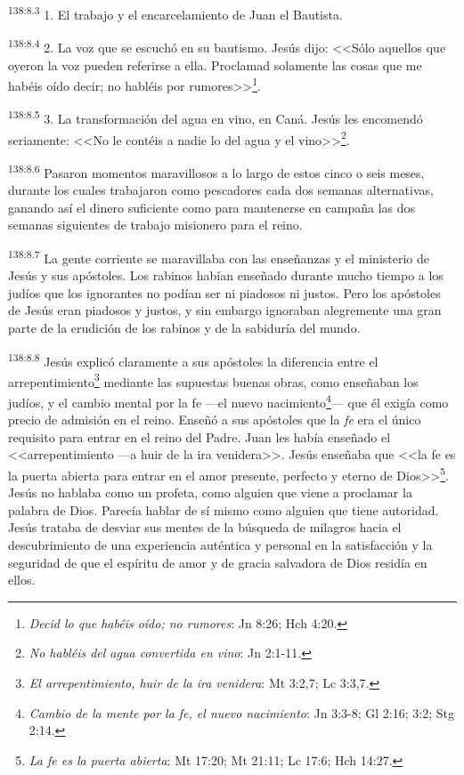 \par 
\textsuperscript{138:8.3} 1. El trabajo y el encarcelamiento de Juan el Bautista.

\par 
\textsuperscript{138:8.4} 2. La voz que se escuchó en su bautismo. Jesús dijo: <<Sólo aquellos que oyeron la voz pueden referirse a ella. Proclamad solamente las cosas que me habéis oído decir; no habléis por rumores>>\footnote{\textit{Decid lo que habéis oído; no rumores}: Jn 8:26; Hch 4:20.}.

\par 
\textsuperscript{138:8.5} 3. La transformación del agua en vino, en Caná. Jesús les encomendó seriamente: <<No le contéis a nadie lo del agua y el vino>>\footnote{\textit{No habléis del agua convertida en vino}: Jn 2:1-11.}.

\par 
\textsuperscript{138:8.6} Pasaron momentos maravillosos a lo largo de estos cinco o seis meses, durante los cuales trabajaron como pescadores cada dos semanas alternativas, ganando así el dinero suficiente como para mantenerse en campaña las dos semanas siguientes de trabajo misionero para el reino.

\par 
\textsuperscript{138:8.7} La gente corriente se maravillaba con las enseñanzas y el ministerio de Jesús y sus apóstoles. Los rabinos habían enseñado durante mucho tiempo a los judíos que los ignorantes no podían ser ni piadosos ni justos. Pero los apóstoles de Jesús eran piadosos y justos, y sin embargo ignoraban alegremente una gran parte de la erudición de los rabinos y de la sabiduría del mundo.

\par 
\textsuperscript{138:8.8} Jesús explicó claramente a sus apóstoles la diferencia entre el arrepentimiento\footnote{\textit{El arrepentimiento, huir de la ira venidera}: Mt 3:2,7; Lc 3:3,7.} mediante las supuestas buenas obras, como enseñaban los judíos, y el cambio mental por la fe ---el nuevo nacimiento\footnote{\textit{Cambio de la mente por la fe, el nuevo nacimiento}: Jn 3:3-8; Gl 2:16; 3:2; Stg 2:14.}--- que él exigía como precio de admisión en el reino. Enseñó a sus apóstoles que la \textit{fe} era el único requisito para entrar en el reino del Padre. Juan les había enseñado el <<arrepentimiento ---a huir de la ira venidera>>. Jesús enseñaba que <<la fe es la puerta abierta para entrar en el amor presente, perfecto y eterno de Dios>>\footnote{\textit{La fe es la puerta abierta}: Mt 17:20; Mt 21:11; Lc 17:6; Hch 14:27.}. Jesús no hablaba como un profeta, como alguien que viene a proclamar la palabra de Dios. Parecía hablar de sí mismo como alguien que tiene autoridad. Jesús trataba de desviar sus mentes de la búsqueda de milagros hacia el descubrimiento de una experiencia auténtica y personal en la satisfacción y la seguridad de que el espíritu de amor y de gracia salvadora de Dios residía en ellos.

